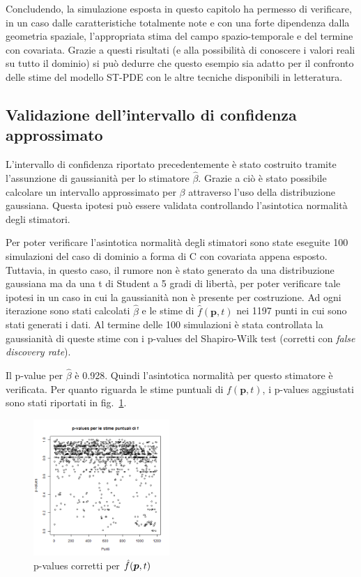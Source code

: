 \documentclass[a4paper,11pt,twoside,openright]{book}							%
\begin{document}
Concludendo, la simulazione esposta in questo capitolo ha permesso di verificare, in un caso dalle caratteristiche totalmente note e con una forte dipendenza dalla geometria spaziale, l'appropriata stima del campo spazio-temporale e del termine con covariata. Grazie a questi risultati (e alla possibilità di conoscere i valori reali su tutto il dominio) si può dedurre che questo esempio sia adatto per il confronto delle stime del modello ST-PDE con le altre tecniche disponibili in letteratura.

\subsection{Validazione dell'intervallo di confidenza approssimato}
L'intervallo di confidenza riportato precedentemente è stato costruito tramite l'assunzione di gaussianità per lo stimatore $\hat{\beta}$. Grazie a ciò è stato possibile calcolare un intervallo approssimato per $\beta$ attraverso l'uso della distribuzione gaussiana. Questa ipotesi può essere validata controllando l'asintotica normalità degli stimatori.

Per poter verificare l'asintotica normalità degli stimatori sono state eseguite 100 simulazioni del caso di dominio a forma di C con covariata appena esposto. Tuttavia, in questo caso, il rumore non è stato generato da una distribuzione gaussiana ma da una t di Student a 5 gradi di libertà, per poter verificare tale ipotesi in un caso in cui la gaussianità non è presente per costruzione. Ad ogni iterazione sono stati calcolati $\hat{\beta}$ e le stime di $\hat{f}(\bm p,t)$ nei 1197 punti in cui sono stati generati i dati. Al termine delle 100 simulazioni è stata controllata la gaussianità di queste stime con i p-values del Shapiro-Wilk test (corretti con \textit{false discovery rate}). 

Il p-value per $\hat{\beta}$ è 0.928. Quindi l'asintotica normalità per questo stimatore è verificata. Per quanto riguarda le stime puntuali di $f(\bm p,t)$, i p-values aggiustati sono stati riportati in fig.~\ref{fig:pval}.
\begin{figure}[h]
	\centering
	\includegraphics[width=0.46\textwidth]{Immagini/pval.png}  
	\caption{p-values corretti per $\protect\hat{f}(\bm p,t)$}
		\label{fig:pval}
\end{figure}
\end{document}
